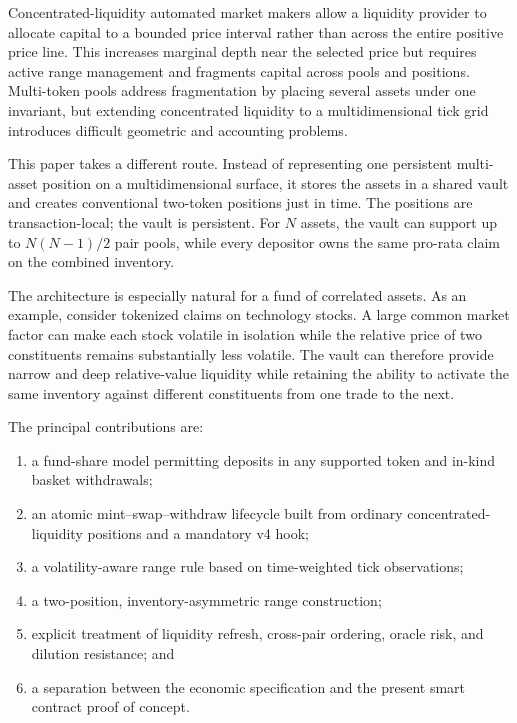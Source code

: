 \documentclass[11pt]{article}
\begin{document}
Concentrated-liquidity automated market makers allow a liquidity provider to
allocate capital to a bounded price interval rather than across the entire
positive price line. This increases marginal depth near the selected price but
requires active range management and fragments capital across pools and
positions. Multi-token pools address fragmentation by placing several assets
under one invariant, but extending concentrated liquidity to a multidimensional
tick grid introduces difficult geometric and accounting problems.

This paper takes a different route. Instead of representing one persistent
multi-asset position on a multidimensional surface, it stores the assets in a
shared vault and creates conventional two-token positions just in time. The
positions are transaction-local; the vault is persistent. For $N$ assets, the
vault can support up to $N(N-1)/2$ pair pools, while every depositor owns the
same pro-rata claim on the combined inventory.

The architecture is especially natural for a fund of correlated assets. As an
example, consider tokenized claims on technology stocks. A large common market
factor can make each stock volatile in isolation while the relative price of
two constituents remains substantially less volatile. The vault can therefore
provide narrow and deep relative-value liquidity while retaining the ability to
activate the same inventory against different constituents from one trade to
the next.

The principal contributions are:

\begin{enumerate}
  \item a fund-share model permitting deposits in any supported token and
        in-kind basket withdrawals;
  \item an atomic mint--swap--withdraw lifecycle built from ordinary
        concentrated-liquidity positions and a mandatory v4 hook;
  \item a volatility-aware range rule based on time-weighted tick observations;
  \item a two-position, inventory-asymmetric range construction;
  \item explicit treatment of liquidity refresh, cross-pair ordering, oracle
        risk, and dilution resistance; and
  \item a separation between the economic specification and the present smart
        contract proof of concept.
\end{enumerate}
\end{document}
